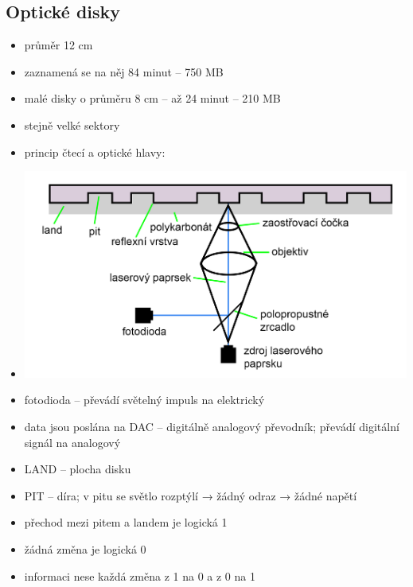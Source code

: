 \documentclass[a4paper,12pt]{article}
\providecommand{\tightlist}{%
\setlength{\itemsep}{0pt}\setlength{\parskip}{0pt}}
\begin{document}
\subsection{Optické disky}

\begin{itemize}
\tightlist
\item průměr 12 cm
\item zaznamená se na něj 84 minut -- 750 MB
\item malé disky o průměru 8 cm -- až 24 minut -- 210 MB
\item stejně velké sektory
\item princip čtecí a optické hlavy:
\item[] \includegraphics[width=12.896cm]{ref/princip-cteci-a-opticke-hlavy.png}
\item fotodioda -- převádí světelný impuls na elektrický
\item data jsou poslána na DAC -- digitálně analogový převodník; převádí
  digitální signál na analogový
\item LAND -- plocha disku
\item PIT -- díra; v pitu se světlo rozptýlí → žádný odraz → žádné napětí
\item přechod mezi pitem a landem je logická 1
\item žádná změna je logická 0
\item informaci nese každá změna z 1 na 0 a z 0 na 1
\end{itemize}
\end{document}
